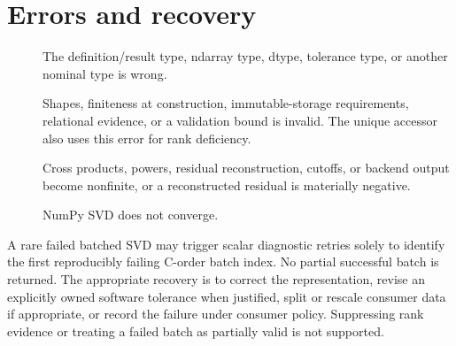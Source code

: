 \section{Errors and recovery}
\begin{description}
  \item[] The definition/result type, ndarray type, dtype, tolerance
        type, or another nominal type is wrong.
  \item[] Shapes, finiteness at construction, immutable-storage
        requirements, relational evidence, or a validation bound is invalid. The
        unique accessor also uses this error for rank deficiency.
  \item[] Cross products, powers, residual reconstruction,
        cutoffs, or backend output become nonfinite, or a reconstructed residual is
        materially negative.
  \item[] NumPy SVD does not converge.
\end{description}
A rare failed batched SVD may trigger scalar diagnostic retries solely to identify the
first reproducibly failing C-order batch index. No partial successful batch is returned.
The appropriate recovery is to correct the representation, revise an explicitly owned
software tolerance when justified, split or rescale consumer data if appropriate, or
record the failure under consumer policy. Suppressing rank evidence or treating a
failed batch as partially valid is not supported.
